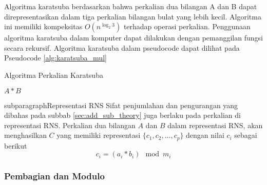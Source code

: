       Algoritma karatsuba berdasarkan bahwa perkalian dua bilangan A dan B dapat direpresentasikan dalam tiga perkalian bilangan bulat yang lebih kecil. Algoritma ini memiliki kompeksitas $O(n^{\log_2 3})$ terhadap operasi perkalian. Penggunaan algoritma karatsuba dalam komputer dapat dilakukan dengan pemanggilan fungsi secara rekursif. Algoritma karatsuba dalam pseudocode dapat dilihat pada Pseudocode \ref{alg:karatsuba_mul}

      \begin{algorithm}
        \caption{Algoritma Perkalian Karatsuba}
        \label{alg:karatsuba_mul}
        \begin{algorithmic}[1]
          \Statex
          \State \Return $A * B$
          \EndIf
          \State

          \State {}
          \EndFunction
        \end{algorithmic}
      \end{algorithm}


      subparagraph{Representasi RNS}
      Sifat penjumlahan dan pengurangan yang dibahas pada subbab \ref{sec:add_sub_theory} juga berlaku pada perkalian di representasi RNS. Perkalian dua bilangan $A$ dan $B$ dalam representasi RNS, akan menghasilkan $C$ yang memiliki representasi $\{c_1,c_2,...,c_p\}$ dengan nilai $c_i$ sebagai berikut
      \begin{equation}
        c_i = (a_i * b_i) \mod m_i
      \end{equation}

    \subsubsection{Pembagian dan Modulo}\label{sec:div_theory}

